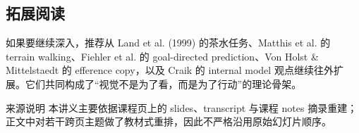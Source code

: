 \documentclass[a4paper]{article}
\begin{document}
\subsection{拓展阅读}
如果要继续深入，推荐从 Land et al. (1999) 的茶水任务、Matthis et al. 的 terrain walking、Fiehler et al. 的 goal-directed prediction、Von Holst \& Mittelstaedt 的 efference copy，以及 Craik 的 internal model 观点继续往外扩展。它们共同构成了“视觉不是为了看，而是为了行动”的理论骨架。

\begin{warningbox}{来源说明}
本讲义主要依据课程页上的 slides、transcript 与课程 notes 摘录重建；正文中对若干跨页主题做了教材式重排，因此不严格沿用原始幻灯片顺序。
\end{warningbox}
\end{document}
